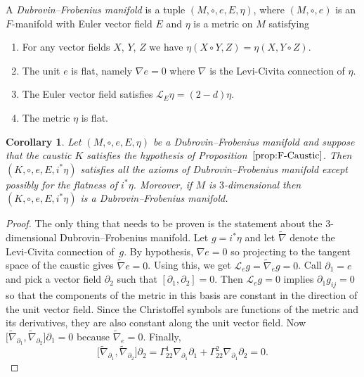 \documentclass[pdftex]{sigma}
\numberwithin{equation}{section}
\newtheorem{Corollary}[Theorem]{Corollary}
\begin{document}
\begin{Definition}
 \label{def:Dubrovin--FrobeniusManifold}
 A \emph{Dubrovin--Frobenius manifold} is a tuple $(M,\circ,e,E,\eta)$, where $(M,\circ,e)$ is an $F$-manifold with Euler vector field $E$ and $\eta$ is a metric on $M$ satisfying
 \begin{enumerate}\itemsep=0pt
 \item For any vector fields $X$, $Y$, $Z$ we have $\eta(X\circ Y,Z)=\eta(X,Y\circ Z)$.
 \item The unit $e$ is flat, namely $\nabla e=0$ where $\nabla$ is the Levi-Civita connection of $\eta$.
 \item The Euler vector field satisfies $\mathcal{L}_{E}\eta=(2-d)\eta$.
 \item The metric $\eta$ is flat.
 \end{enumerate}
 \end{Definition}
\begin{Corollary}
 Let $(M,\circ,e,E,\eta)$ be a Dubrovin--Frobenius manifold and suppose that the caustic $K$ satisfies the hypothesis of Proposition~$\ref{prop:F-Caustic}$. Then $(K,\circ,e,E,i^{*}\eta)$ satisfies all the axioms of Dubrovin--Frobenius manifold except possibly for the flatness of $i^{*}\eta$. Moreover, if $M$ is $3$-dimensional then $(K,\circ,e,E,i^{*}\eta)$ is a Dubrovin--Frobenius manifold.
\end{Corollary}
\begin{proof}
 The only thing that needs to be proven is the statement about the $3$-dimensional Dubrovin--Frobenius manifold. Let $g=i^{*}\eta$ and let $\tilde{\nabla}$ denote the Levi-Civita connection of~$g$. By hypothesis, $\nabla e=0$ so projecting to the tangent space of the caustic gives $\tilde{\nabla} e=0$. Using this, we get $\mathcal{L}_{e}g=\tilde{\nabla}_{e}g=0$. Call $\partial_{1}=e$ and pick a vector field $\partial_{2}$ such that $[\partial_{1},\partial_{2}]=0$. Then $\mathcal{L}_{e}g=0$ implies $\partial_{1}g_{ij}=0$ so that the components of the metric in this basis are constant in the direction of the unit vector field. Since the Christoffel symbols are functions of the metric and its derivatives, they are also constant along the unit vector field. Now $\big[\tilde{\nabla}_{\partial_{1}},\tilde{\nabla}_{\partial_{2}}\big]\partial_{1}=0$ because $\tilde{\nabla}_{e}=0$. Finally,
 \begin{equation*}
 \big[\tilde{\nabla}_{\partial_{1}},\tilde{\nabla}_{\partial_{2}}\big]\partial_{2}=\Gamma_{22}^{1}
 \nabla_{\partial_{1}}\partial_{1}+\Gamma_{22}^{2}\nabla_{\partial_{1}}\partial_{2}=0.\tag*{\qed}
 \end{equation*}\renewcommand{\qed}{}
 \end{proof}
\end{document}
